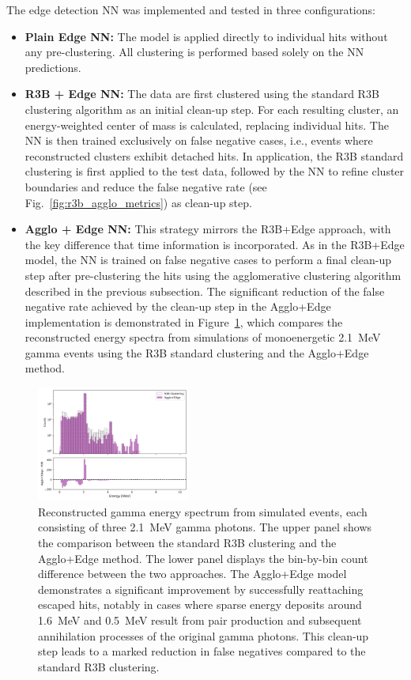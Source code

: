 \documentclass[final,5p,times,twocolumn]{elsarticle}
\begin{document}
The edge detection NN was implemented and tested in three configurations:

\begin{itemize}
    \item \textbf{Plain Edge NN:} The model is applied directly to individual hits without any pre-clustering. All clustering is performed based solely on the NN predictions.
    \item \textbf{R3B + Edge NN:} The data are first clustered using the standard R3B clustering algorithm as an initial clean-up step. For each resulting cluster, an energy-weighted center of mass is calculated, replacing individual hits. The  NN is then trained exclusively on false negative cases, i.e., events where reconstructed clusters exhibit detached hits. In application, the R3B standard clustering is first applied to the test data, followed by the NN to refine cluster boundaries and reduce the false negative rate (see Fig.~\ref{fig:r3b_agglo_metrics}) as clean-up step.
    \item \textbf{Agglo + Edge NN:} This strategy mirrors the R3B+Edge approach, with the key difference that time information is incorporated. As in the R3B+Edge model, the NN is trained on false negative cases to perform a final clean-up step after pre-clustering the hits using the agglomerative clustering algorithm described in the previous subsection. The significant reduction of the false negative rate achieved by the clean-up step in the Agglo+Edge implementation is demonstrated in Figure~\ref{fig:2_1_mev_r3b_aggloNN}, which compares the reconstructed energy spectra from simulations of monoenergetic 2.1~MeV gamma events using the R3B standard clustering and the Agglo+Edge method.
\end{itemize}
\begin{figure}[!htb]
        \centering
        \includegraphics[width=0.45\textwidth]{spec_2_1agglo_edge_vsr3b.png}
        \caption{Reconstructed gamma energy spectrum from simulated events, each consisting of three 2.1~MeV gamma photons. The upper panel shows the comparison between the standard R3B clustering and the Agglo+Edge method. The lower panel displays the bin-by-bin count difference between the two approaches. The Agglo+Edge model demonstrates a significant improvement by successfully reattaching escaped hits, notably in cases where sparse energy deposits around 1.6~MeV and 0.5~MeV result from pair production and subsequent annihilation processes of the original gamma photons. This clean-up step leads to a marked reduction in false negatives compared to the standard R3B clustering.}
        \label{fig:2_1_mev_r3b_aggloNN}%
\end{figure}
\end{document}
